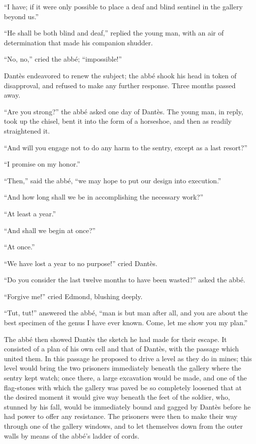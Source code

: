 “I have; if it were only possible to place a deaf and blind sentinel in
the gallery beyond us.”

“He shall be both blind and deaf,” replied the young man, with an air
of determination that made his companion shudder.

“No, no,” cried the abbé; “impossible!”

Dantès endeavored to renew the subject; the abbé shook his head in
token of disapproval, and refused to make any further response. Three
months passed away.

“Are you strong?” the abbé asked one day of Dantès. The young man, in
reply, took up the chisel, bent it into the form of a horseshoe, and
then as readily straightened it.

“And will you engage not to do any harm to the sentry, except as a last
resort?”

“I promise on my honor.”

“Then,” said the abbé, “we may hope to put our design into execution.”

“And how long shall we be in accomplishing the necessary work?”

“At least a year.”

“And shall we begin at once?”

“At once.”

“We have lost a year to no purpose!” cried Dantès.

“Do you consider the last twelve months to have been wasted?” asked the
abbé.

“Forgive me!” cried Edmond, blushing deeply.

“Tut, tut!” answered the abbé, “man is but man after all, and you are
about the best specimen of the genus I have ever known. Come, let me
show you my plan.”

The abbé then showed Dantès the sketch he had made for their escape. It
consisted of a plan of his own cell and that of Dantès, with the
passage which united them. In this passage he proposed to drive a level
as they do in mines; this level would bring the two prisoners
immediately beneath the gallery where the sentry kept watch; once
there, a large excavation would be made, and one of the flag-stones
with which the gallery was paved be so completely loosened that at the
desired moment it would give way beneath the feet of the soldier, who,
stunned by his fall, would be immediately bound and gagged by Dantès
before he had power to offer any resistance. The prisoners were then to
make their way through one of the gallery windows, and to let
themselves down from the outer walls by means of the abbé’s ladder of
cords.

